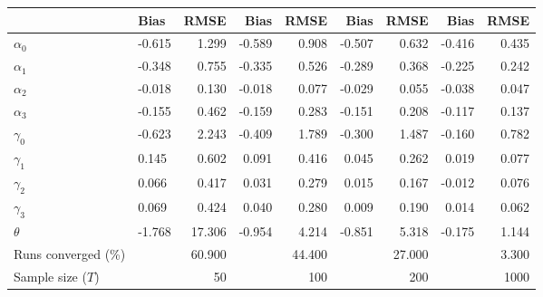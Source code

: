 
\begin{tabular}[t]{llrrrrrrr}
\toprule
  & Bias & RMSE & Bias & RMSE & Bias & RMSE & Bias & RMSE\\
\midrule
$\alpha_{0}$ & -0.615 & 1.299 & -0.589 & 0.908 & -0.507 & 0.632 & -0.416 & 0.435\\
$\alpha_{1}$ & -0.348 & 0.755 & -0.335 & 0.526 & -0.289 & 0.368 & -0.225 & 0.242\\
$\alpha_{2}$ & -0.018 & 0.130 & -0.018 & 0.077 & -0.029 & 0.055 & -0.038 & 0.047\\
$\alpha_{3}$ & -0.155 & 0.462 & -0.159 & 0.283 & -0.151 & 0.208 & -0.117 & 0.137\\
$\gamma_{0}$ & -0.623 & 2.243 & -0.409 & 1.789 & -0.300 & 1.487 & -0.160 & 0.782\\
$\gamma_{1}$ & 0.145 & 0.602 & 0.091 & 0.416 & 0.045 & 0.262 & 0.019 & 0.077\\
$\gamma_{2}$ & 0.066 & 0.417 & 0.031 & 0.279 & 0.015 & 0.167 & -0.012 & 0.076\\
$\gamma_{3}$ & 0.069 & 0.424 & 0.040 & 0.280 & 0.009 & 0.190 & 0.014 & 0.062\\
$\theta$ & -1.768 & 17.306 & -0.954 & 4.214 & -0.851 & 5.318 & -0.175 & 1.144\\
Runs converged (\%) &  & 60.900 &  & 44.400 &  & 27.000 &  & 3.300\\
Sample size ($T$) &  & 50 &  & 100 &  & 200 &  & 1000\\
\bottomrule
\end{tabular}
